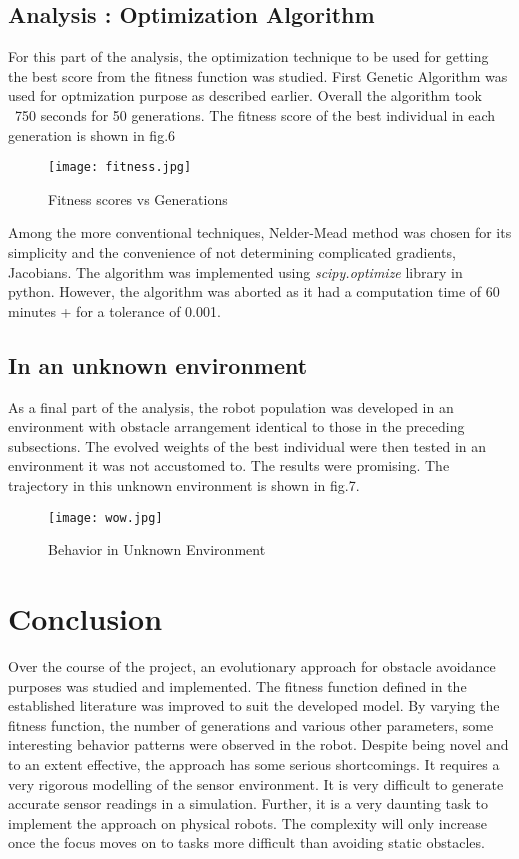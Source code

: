 \documentclass[12pt]{elsarticle}
\begin{document}
\subsection{Analysis : Optimization Algorithm}
For this part of the analysis, the optimization technique to be used for getting the best score from the fitness function was 
studied. First Genetic Algorithm was used for optmization purpose as described earlier. Overall the algorithm took
~750 seconds for 50 generations. The fitness score of the best individual in each generation is shown in fig.6

\begin{figure}[h]
\centering\texttt{[image: fitness.jpg]}
\caption{Fitness scores vs Generations}
\end{figure}
Among the more conventional techniques, Nelder-Mead method was chosen for its simplicity
and the convenience of not determining complicated gradients, Jacobians. The algorithm
was implemented using \textit{scipy.optimize} library in python. However, the algorithm
was aborted as it had a computation time of 60 minutes + for a tolerance of 0.001. 

\subsection{In an unknown environment}
As a final part of the analysis, the robot population was developed in an environment with obstacle arrangement
identical to those in the preceding subsections. The evolved weights of the best individual
were then tested in an environment it was not accustomed to. The results were promising.
The trajectory in this unknown environment is shown in fig.7.
\begin{figure}[h]
\centering\texttt{[image: wow.jpg]}
\caption{Behavior in Unknown Environment}
\end{figure}
 
\section{Conclusion}
Over the course of the project, an evolutionary approach for obstacle avoidance purposes
was studied and implemented. The fitness function defined in the established literature
was improved to suit the developed model. By varying the fitness function, the number of generations
and various other parameters, some interesting behavior patterns were observed in the robot. 
Despite being novel and to an extent effective, the approach has some serious shortcomings. 
It requires a very rigorous modelling of the sensor environment. It is very difficult to generate
accurate sensor readings in a simulation. Further, it is a very daunting task to implement
the approach on physical robots. The complexity will only increase once the focus moves
on to tasks more difficult than avoiding static obstacles. 
\end{document}
